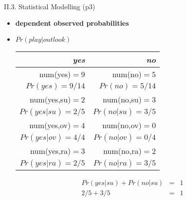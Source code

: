 \documentclass[handout]{beamer}
\newcommand{\strong}[1]{\textbf{\color{teal} #1}}
\begin{document}
\begin{frame}{II.3. Statistical Modelling (p3)}
\begin{itemize}
\item[] \strong{dependent observed probabilities}
\item \textbf{$Pr(play|outlook)$}\\
\begin{tabular}{|r|r|}
\emph{yes}       & \emph{no} \\
\hline
num(yes)$=9$     & num(no)$=5$   \\
$Pr(yes)=9/14$   & $Pr(no)=5/14$ \\
\hline
num(yes,su)$=2$  & num(no,su)$=3$  \\
$Pr(yes|su)=2/5$ & $Pr(no|su)=3/5$ \\
\hline
num(yes,ov)$=4$  & num(no,ov)$=0$  \\
$Pr(yes|ov)=4/4$ & $Pr(no|ov)=0/4$ \\
\hline
num(yes,ra)$=3$  & num(no,ra)$=2$  \\
$Pr(yes|ra)=2/5$ & $Pr(no|ra)=3/5$ \\
\hline
\end{tabular}
\[
\begin{array}{rcl}
Pr(yes|su) + Pr(no|su) & = & 1 \\
2/5 + 3/5 & = & 1 \\
\end{array}
\]
\end{itemize}
\end{frame}
\end{document}
